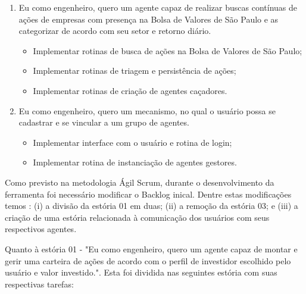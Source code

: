 \begin{enumerate}
\item Eu como engenheiro, quero um agente capaz de realizar buscas contínuas de ações de empresas com presença na Bolsa de Valores de São Paulo e as categorizar de acordo com seu setor e retorno diário.
		\begin{itemize}
		\item Implementar rotinas de busca de ações na Bolsa de Valores de São Paulo;
		\item Implementar rotinas de triagem e persistência de ações;
		\item Implementar rotinas de criação de agentes caçadores.
		\end{itemize}

\item Eu como engenheiro, quero um mecanismo, no qual o usuário possa se cadastrar e se vincular a um grupo de agentes.
		\begin{itemize}
		\item Implementar interface com o usuário e rotina de login;
		\item Implementar rotina de instanciação de agentes gestores.
		\end{itemize}

\end{enumerate}

Como previsto na metodologia Ágil Scrum, durante o desenvolvimento da ferramenta foi necessário modificar o Backlog inical. Dentre estas modificações temos : (i) a divisão da estória 01 em duas; (ii) a remoção da estória 03; e (iii) a criação de uma estória relacionada à comunicação dos usuários com seus respectivos agentes.

Quanto à estória 01 - "Eu como engenheiro, quero um agente capaz de montar e gerir uma carteira de ações de acordo com o perfil de investidor escolhido pelo usuário e valor investido.". Esta foi dividida nas seguintes estória com suas respectivas tarefas:

